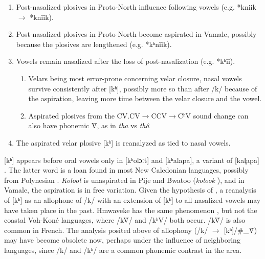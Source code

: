 			
	\begin{enumerate}
	\sloppy
	\item Post-nasalized plosives in Proto-North influence following vowels (e.g. *kniik  $\rightarrow$ *knĩĩk).
	\item Post-nasalized plosives in Proto-North become aspirated in Vamale, possibly because the plosives are lengthened (e.g. *kʰnĩĩk). \parencite[76]{campbell_phenomenon_1987}
	\item Vowels remain nasalized after the loss of post-nasalization (e.g. *kʰĩĩ).
	\begin{enumerate}
		\item Velars being most error-prone concerning velar closure, nasal vowels survive consistently after [kʰ], possibly more so than after /k/ because of the aspiration, leaving more time between the velar closure and the vowel.
		\item Aspirated plosives from the CV.CV$\rightarrow$CCV$\rightarrow$CʰV sound change can also have phonemic Ṽ, as in \textit{tha}  vs \textit{thâ} 
	\end{enumerate}
	\item The aspirated velar plosive [kʰ] is reanalyzed as tied to nasal vowels.
	\end{enumerate}
	
[kʰ] appears before oral vowels only in [kʰolɔːt]  and [kʰalapa], a variant of [kal̥apa] . The latter word is a loan found in most New Caledonian languages, possibly from Polynesian \parencite[364]{hollyman_polynesian_1959}. \textit{Koloot}  is unaspirated in Pije and Bwatoo (\textit{kolook} ), and in Vamale, the aspiration is in free variation. Given the hypothesis of \citeauthor{ozanne-rivierre_structural_1995}, a reanalysis of [kʰ] as an allophone of /k/ with an extension of [kʰ] to all nasalized vowels may have taken place in the past. Hmwaveke has the same phenomenon \parencite[13]{campbell_phenomenon_1987}, but not the coastal Voh-Koné languages, where /kṼ/ and /kʰV/ both occur. /kṼ/ is also common in French. The analysis posited above of allophony (/k/ $\rightarrow$ [kʰ]/\#\_Ṽ) may have become obsolete now, perhaps under the influence of neighboring languages, since /k/ and /kʰ/ are a common phonemic contrast in the area.

